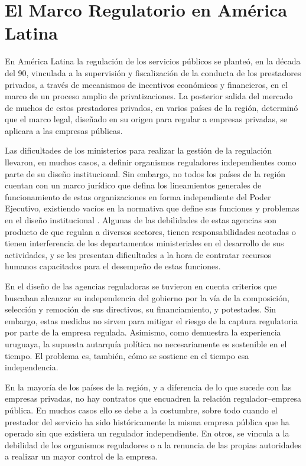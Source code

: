 \documentclass[
  12pt,
  spanish,
]{book}
\begin{document}
\hypertarget{el-marco-regulatorio-en-amuxe9rica-latina}{%
\section{El Marco Regulatorio en América Latina}\label{el-marco-regulatorio-en-amuxe9rica-latina}}

En América Latina la regulación de los servicios públicos se planteó, en la década del 90, vinculada a la supervisión y fiscalización de la conducta de los prestadores privados, a través de mecanismos de incentivos económicos y financieros, en el marco de un proceso amplio de privatizaciones. La posterior salida del mercado de muchos de estos prestadores privados, en varios países de la región, determinó que el marco legal, diseñado en su origen para regular a empresas privadas, se aplicara a las empresas públicas.

Las dificultades de los ministerios para realizar la gestión de la regulación llevaron, en muchos casos, a definir organismos reguladores independientes como parte de su diseño institucional. Sin embargo, no todos los países de la región cuentan con un marco jurídico que defina los lineamientos generales de funcionamiento de estas organizaciones en forma independiente del Poder Ejecutivo, existiendo vacíos en la normativa que define sus funciones y problemas en el diseño institucional \citep{Rozas2013}. Algunas de las debilidades de estas agencias son producto de que regulan a diversos sectores, tienen responsabilidades acotadas o tienen interferencia de los departamentos ministeriales en el desarrollo de sus actividades, y se les presentan dificultades a la hora de contratar recursos humanos capacitados para el desempeño de estas funciones.

En el diseño de las agencias reguladoras se tuvieron en cuenta criterios que buscaban alcanzar su independencia del gobierno por la vía de la composición, selección y remoción de sus directivos, su financiamiento, y potestades. Sin embargo, estas medidas no sirven para mitigar el riesgo de la captura regulatoria por parte de la empresa regulada. Asimismo, como demuestra la experiencia uruguaya, la supuesta autarquía política no necesariamente es sostenible en el tiempo. El problema es, también, cómo se sostiene en el tiempo esa independencia.

En la mayoría de los países de la región, y a diferencia de lo que sucede con las empresas privadas, no hay contratos que encuadren la relación regulador--empresa pública. En muchos casos ello se debe a la costumbre, sobre todo cuando el prestador del servicio ha sido históricamente la misma empresa pública que ha operado sin que existiera un regulador independiente. En otros, se vincula a la debilidad de los organismos reguladores o a la renuncia de las propias autoridades a realizar un mayor control de la empresa.
\end{document}
